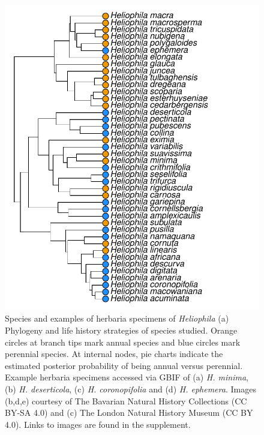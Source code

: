 \documentclass[man,floatsintext]{apa6}
\theoremstyle{definition}
\theoremstyle{definition}
\theoremstyle{definition}
\theoremstyle{remark}
\begin{document}
\begin{figure}[!h]
\includegraphics[width=\textwidth]{../figures/phylogeny} \caption{Species and examples of herbaria specimens of
\emph{Heliophila} (a) Phylogeny and life history strategies of species
studied. Orange circles at branch tips mark annual species and blue
circles mark perennial species. At internal nodes, pie charts indicate
the estimated posterior probability of being annual versus perennial.
Example herbaria specimens accessed via GBIF of (a) \emph{H. minima},
(b) \emph{H. deserticola}, (c) \emph{H. coronopifolia} and (d) \emph{H.
ephemera}. Images (b,d,e) courtesy of The Bavarian Natural History
Collections (CC BY-SA 4.0) and (c) The London Natural History Museum (CC
BY 4.0). Links to images are found in the supplement.}\label{fig:phylogeny}
\end{figure}
\end{document}
